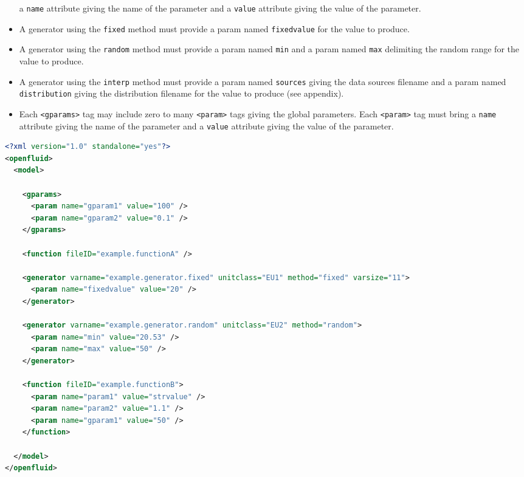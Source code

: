 \begin{itemize}
  a \texttt{name} attribute giving the name of the parameter and a \texttt{value} 
  attribute giving the value of the parameter.
  \item A generator using the \texttt{fixed} method must provide a
  param named \texttt{fixedvalue} for the value to produce.
  \item A generator using the \texttt{random} method must provide a
  param named \texttt{min} and a param named \texttt{max} delimiting the
  random range for the value to produce.
  \item A generator using the \texttt{interp} method must provide a
  param named \texttt{sources} giving the data sources filename and a param
  named \texttt{distribution} giving the distribution filename for the value to
  produce (see appendix).
  \item Each \texttt{<gparams>} tag may include zero to many \texttt{<param>}
  tags giving the global parameters. Each \texttt{<param>} tag
  must bring a \texttt{name} attribute giving the name of the parameter and a \texttt{value} 
  attribute giving the value of the parameter.
\end{itemize}

\begin{lstlisting}[language=xml,title=\footnotesize\textit{example}]
<?xml version="1.0" standalone="yes"?>
<openfluid>
  <model>

    <gparams>
      <param name="gparam1" value="100" />
      <param name="gparam2" value="0.1" />
    </gparams>

    <function fileID="example.functionA" />

    <generator varname="example.generator.fixed" unitclass="EU1" method="fixed" varsize="11">
      <param name="fixedvalue" value="20" />
    </generator>

    <generator varname="example.generator.random" unitclass="EU2" method="random">
      <param name="min" value="20.53" />
      <param name="max" value="50" />
    </generator>

    <function fileID="example.functionB">
      <param name="param1" value="strvalue" />
      <param name="param2" value="1.1" />
      <param name="gparam1" value="50" />
    </function>

  </model>
</openfluid>
\end{lstlisting}




